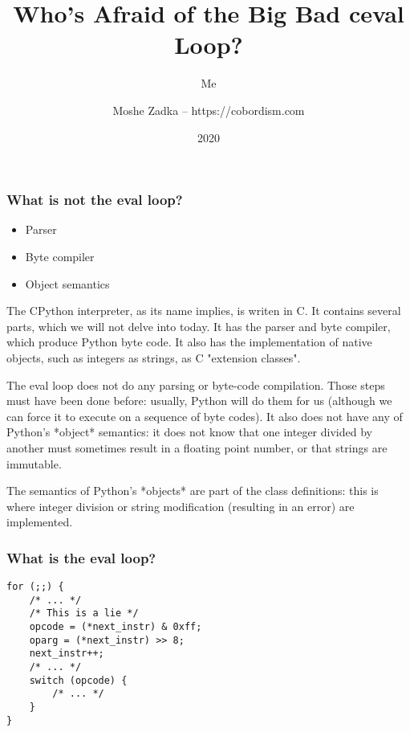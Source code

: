 \usepackage{hyperref}
\usepackage{graphicx}
\usepackage{listings}
\usepackage{textcomp}
\usepackage{fancyvrb}


\title{Who's Afraid of the Big Bad ceval Loop?}
\subtitle{Me}
\author{Moshe Zadka -- https://cobordism.com}
\date{2020}


\begin{titlepage}
\maketitle
\end{titlepage}

\frame{\titlepage}

\begin{frame}
\frametitle{What is not the eval loop?}
\begin{itemize}
\item Parser\pause
\item Byte compiler\pause
\item Object semantics
\end{itemize}
\end{frame}

The CPython interpreter,
as its name implies,
is writen in C.
It contains several parts,
which we will not delve into today.
It has the parser and byte compiler,
which produce Python byte code.
It also has the implementation of
native objects,
such as integers as strings,
as C
"extension classes".

The eval loop does not do any parsing or byte-code compilation.
Those steps must have been done before:
usually,
Python will do them for us
(although we can force it to execute on a sequence
of byte codes).
It also does not have any of Python's
*object*
semantics:
it does not know that one integer divided by another must sometimes
result in a floating point number,
or that strings are immutable.

The semantics of Python's
*objects*
are part of the class definitions:
this is where integer division
or string modification
(resulting in an error)
are implemented.

\begin{frame}[fragile]
\frametitle{What is the eval loop?}

\begin{lstlisting}
for (;;) {
    /* ... */
    /* This is a lie */
    opcode = (*next_instr) & 0xff;
    oparg = (*next_instr) >> 8;
    next_instr++;
    /* ... */
    switch (opcode) {
        /* ... */
    }
}
\end{lstlisting}

\end{frame}

